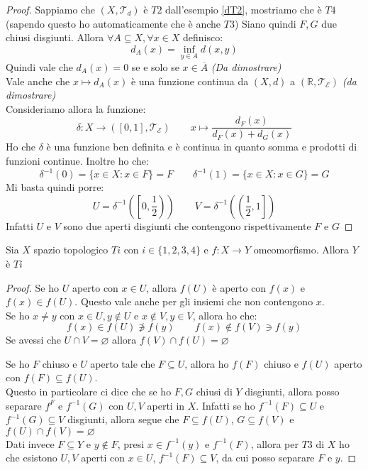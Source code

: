 \documentclass[11pt,a4paper,twoside]{article}
\theoremstyle{definition}
\begin{document}
\begin{proof}
	Sappiamo che $(X, \mathcal T_d)$ è $T2$ dall'esempio \ref{dT2}, mostriamo che è $T4$ (sapendo questo ho automaticamente che è anche $T3$)
	Siano quindi $F, G$ due chiusi disgiunti. Allora $\forall A \subseteq X, \forall x \in X$ definisco:
	\[d_A(x) = \inf_{y \in A}d(x,y)\]
	Quindi vale che $d_A(x) = 0$ se e solo se $x \in \overline A$ \textit{(Da dimostrare)}\\
	Vale anche che $x \mapsto d_A(x)$ è una funzione continua da $(X, d)$ a $(\mathbb R, \mathcal T_\mathcal E)$ \textit{(da dimostrare)}\\
	Consideriamo allora la funzione:
	\[\delta : X \to ([0,1], \mathcal T_\mathcal E)\qquad x \mapsto \frac{d_F(x)}{d_F(x) + d_G(x)}\]
	Ho che $\delta$ è una funzione ben definita e è continua in quanto somma e prodotti di funzioni continue. Inoltre ho che:
	\[ \delta^{-1}(0) = \{x \in X: x \in F\} = F \qquad \delta^{-1}(1) = \{x \in X : x \in G\} = G\]
	Mi basta quindi porre:
	\[U = \delta^{-1}\left(\left[0, \frac 12\right)\right)\qquad V = \delta^{-1}\left(\left(\frac 12, 1\right]\right)\]
	Infatti $U$ e $V$ sono due aperti disgiunti che contengono rispettivamente $F$ e $G$
\end{proof}

\begin{lemma}{}{}
	Sia $X$ spazio topologico $Ti$ con $i \in \{1,2,3,4\}$ e $f:X \to Y$ omeomorfismo. Allora $Y$ è $Ti$
\end{lemma}

\begin{proof}
	 Se ho $U$ aperto con $x \in U$, allora $f(U)$ è aperto con $f(x)$ e $f(x) \in f(U)$. Questo vale anche per gli insiemi che non contengono $x$.\\
	Se ho $x \neq y$ con $x \in U, y \not \in U$ e $x \not \in V, y \in V$, allora ho che:
	\[ f(x) \in f(U) \not \ni f(y)\qquad f(x)\not \in f(V) \ni f(y) \]
	Se avessi che $U \cap V = \varnothing$ allora $f(V)\cap f(U) = \varnothing$

	 Se ho $F$ chiuso e $U$ aperto tale che $F \subseteq U$, allora ho $f(F)$ chiuso e $f(U)$ aperto con $f(F) \subseteq f(U)$.\\
	Questo in particolare ci dice che se ho $F,G$ chiusi di $Y$ disgiunti, allora posso separare $f^{F}$ e $f^{-1}(G)$ con $U,V$ aperti in $X$. Infatti se ho $f^{-1}(F)\subseteq U$ e $f^{-1}(G)\subseteq V$ disgiunti, allora segue che $F \subseteq f(U)$, $G \subseteq f(V)$ e $f(U) \cap f(V) = \varnothing$\\
	Dati invece $F\subseteq Y$ e $y \not \in F$, presi $x \in f^{-1}(y)$ e $f^{-1}(F)$, allora per $T3$ di $X$ ho che esistono $U,V$ aperti con $x \in U$, $f^{-1}(F) \subseteq V$, da cui posso separare $F$ e $y$.
\end{proof}
\end{document}
